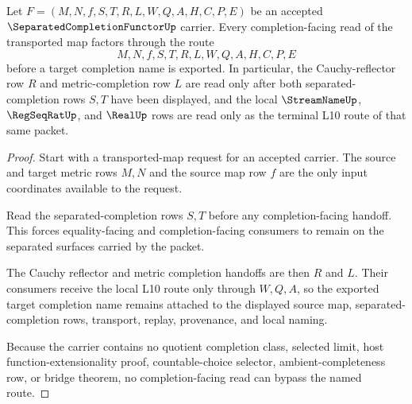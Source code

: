 \begin{theorem}
\label{thm:separated-completion-functor-cauchy-reflector-route}
Let $F=(M,N,f,S,T,R,L,W,Q,A,H,C,P,E)$ be an accepted $\SeparatedCompletionFunctorUp$ carrier. Every completion-facing read of the transported map factors through the route
$$
M,N,f,S,T,R,L,W,Q,A,H,C,P,E
$$
before a target completion name is exported. In particular, the Cauchy-reflector row $R$ and metric-completion row $L$ are read only after both separated-completion rows $S,T$ have been displayed, and the local $\StreamNameUp$, $\RegSeqRatUp$, and $\RealUp$ rows are read only as the terminal L10 route of that same packet.
\end{theorem}
\begin{proof}
Start with a transported-map request for an accepted carrier. The source and target metric rows $M,N$ and the source map row $f$ are the only input coordinates available to the request.

Read the separated-completion rows $S,T$ before any completion-facing handoff. This forces equality-facing and completion-facing consumers to remain on the separated surfaces carried by the packet.

The Cauchy reflector and metric completion handoffs are then $R$ and $L$. Their consumers receive the local L10 route only through $W,Q,A$, so the exported target completion name remains attached to the displayed source map, separated-completion rows, transport, replay, provenance, and local naming.

Because the carrier contains no quotient completion class, selected limit, host function-extensionality proof, countable-choice selector, ambient-completeness row, or bridge theorem, no completion-facing read can bypass the named route.
\end{proof}



